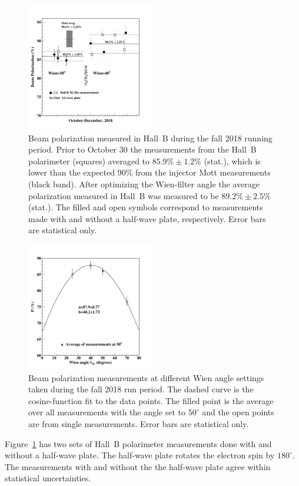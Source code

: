 \begin{figure}[ht]
\begin{center}
\includegraphics[width=0.5\textwidth]{Moller-RGA-2018.pdf}
\caption{Beam polarization measured in Hall~B during the fall 2018 running period. Prior to October 30 the
  measurements from the Hall~B polarimeter (squares) averaged to $85.9\%\pm1.2\%$ (stat.), which is lower than
  the expected 90\% from the injector Mott measurements (black band). After optimizing the Wien-filter angle the
  average polarization measured in Hall~B was measured to be $89.2\%\pm2.5\%$ (stat.). The filled and open symbols
  correspond to measurements made with and without a half-wave plate, respectively. Error bars are statistical only.}
\label{fig:molrga}
\end{center}
\end{figure}

\begin{figure}[ht]
\begin{center}
\includegraphics[width=0.5\textwidth]{Hall-B_fall_spin_dance.pdf}
\caption{Beam polarization measurements at different Wien angle settings taken during the fall 2018 run period.
  The dashed curve is the cosine-function fit to the data points. The filled point is the average over all measurements
  with the angle set to $50^\circ$ and the open points are from single measurements. Error bars are statistical only. }
\label{fig:sdance}
\end{center}
\end{figure}

Figure~\ref{fig:molrga} has two sets of Hall~B polarimeter measurements done with and without a half-wave plate. The
half-wave plate rotates the electron spin by $180^\circ$. The measurements with and without the the half-wave plate
agree within statistical uncertainties. 
